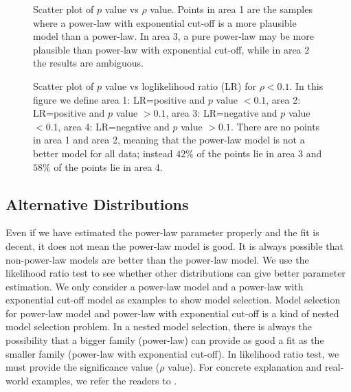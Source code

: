 \documentclass[paper]{ieice}
\begin{document}
\begin{figure}
\centering
{}
\caption{Scatter plot of $p$ value vs $\rho$ value. 
        Points in area 1 are the samples where a power-law with exponential cut-off is a more plausible model than a power-law.
        In area 3, a pure power-law may be more plausible than power-law with exponential cut-off, while in area 2 the results are ambiguous.} 
\label{fig:scatter-pvalue-vs-rho}
\vspace{-2mm}
\end{figure}

\begin{figure}
\centering
{}
\caption{Scatter plot of $p$ value vs loglikelihood ratio (LR) for $\rho < 0.1$. In this figure we define area 1: LR=positive and $p$ value $<0.1$, area 2: LR=positive and $p$ value $>0.1$, area 3: LR=negative and $p$ value $<0.1$, area 4: LR=negative and $p$ value $>0.1$. There are no points in area 1 and area 2, meaning that the power-law model is not a better model for all data; instead $42\%$ of the points lie in area 3 and $58\%$ of the points lie in area 4.} 
\label{fig:scatter-pvalue-vs-lr-for-rho-le-01}
\vspace{-2mm}
\end{figure}


\subsection{Alternative Distributions}
Even if we have estimated the power-law parameter properly and the fit is decent, it does not mean the power-law model is good.
It is always possible that non-power-law models are better than the power-law model.
We use the likelihood ratio test \cite{vuong1989likelihood} to see whether other distributions can give better parameter estimation.
We only consider a power-law model and a power-law with exponential cut-off model as examples to show model selection.
Model selection for power-law model and power-law with exponential cut-off is a kind of nested model selection problem. 
In a nested model selection,  there is always the possibility that a bigger family (power-law) can provide as good a fit as the smaller family (power-law with exponential cut-off). 
In likelihood ratio test, we must provide the significance value ($\rho$ value).
For concrete explanation and real-world examples, we refer the readers to \cite{clauset2009power}.
\end{document}
